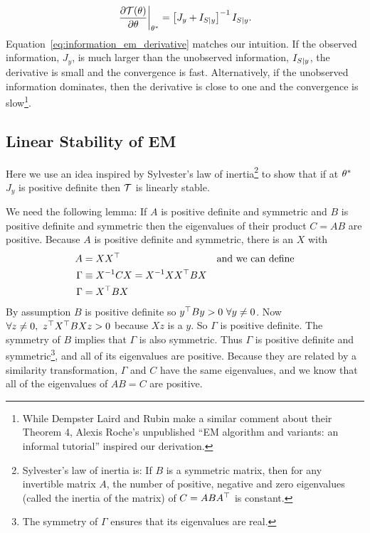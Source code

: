 \begin{equation}
  \label{eq:information_em_derivative}
  \left.\frac{\partial \EMmap(\parameters)}{\partial \parameters}
  \right|_{\EMfixedPoint} = \left[J_y + I_{S \given y}  \right]^{-1}
  I_{S \given y}.
\end{equation}
Equation~\eqref{eq:information_em_derivative} matches our intuition.
If the observed information, $J_y$, is much larger than the unobserved
information, $I_{S \mid y}$, the derivative is small and the
convergence is fast.  Alternatively, if the unobserved information
dominates, then the derivative is close to one and the convergence is
slow\footnote{While Dempster Laird and Rubin\cite{Dempster77} make a
  similar comment about their Theorem 4, Alexis Roche's unpublished
  ``EM algorithm and variants: an informal tutorial'' inspired our
  derivation.}.

\subsection*{Linear Stability of EM}
\label{em_stabiltiy}

Here we use an idea inspired by Sylvester's law of
inertia\footnote{Sylvester's law of inertia is: If $B$ is a symmetric
  matrix, then for any invertible matrix $A$, the number of positive,
  negative and zero eigenvalues (called the inertia of the matrix) of
  $C = A B A^\top$ is constant.} to show that if at
${\theta^*}$ $J_y$ is positive definite then $\EMmap$ is linearly
stable.

We need the following lemma: If $A$ is positive definite and symmetric
and $B$ is positive definite and symmetric then the eigenvalues of
their product $C = AB$ are positive.  Because $A$ is positive
definite and symmetric, there is an $X$ with
\begin{align*}
  A &= X X^\top  &&\text{and we can define}\\
  \Gamma &\equiv X^{-1} C X = X^{-1} X X^\top B X \\
  \Gamma &= X^\top B X \\
\end{align*}
By assumption $B$ is positive definite so
$y^\top B y > 0 ~ \forall y \neq 0$.  Now
$\forall z \neq 0, ~ z^\top X^\top B X z > 0$ because $Xz$
is a $y$.  So $\Gamma$ is positive definite.  The symmetry of $B$
implies that $\Gamma$ is also symmetric.  Thus $\Gamma$ is positive
definite and symmetric\footnote{The symmetry of $\Gamma$ ensures that
  its eigenvalues are real.}, and all of its eigenvalues are positive.
Because they are related by a similarity transformation, $\Gamma$ and
$C$ have the same eigenvalues, and we know that all of the eigenvalues
of $AB = C$ are positive.


